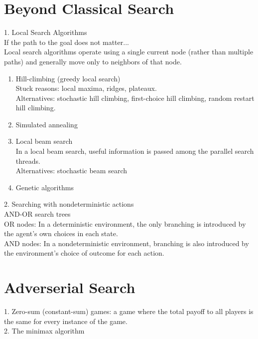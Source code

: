 \documentclass[12pt]{article}
\begin{document}
\section{Beyond Classical Search}

1. Local Search Algorithms \\

If the path to the goal does not matter... \\

Local search algorithms operate using a single current node (rather than multiple paths) and generally move only to neighbors of that node.

\begin{enumerate} 
  \item Hill-climbing (greedy local search) \\
    Stuck reasons: local maxima, ridges, plateaux. \\
    Alternatives: stochastic hill climbing, first-choice hill climbing, random restart hill climbing.
  \item Simulated annealing
  \item Local beam search \\
    In a local beam search, useful information is passed among the parallel search threads. \\
    Alternatives: stochastic beam search
  \item Genetic algorithms
\end{enumerate}

2. Searching with nondeterministic actions \\

AND-OR search trees \\

OR nodes: In a deterministic environment, the only branching is introduced by the agent's own choices in each state. \\
AND nodes: In a nondeterministic environment, branching is also introduced by the environment's choice of outcome for each action. \\

\section{Adverserial Search}

1. Zero-sum (constant-sum) games: a game where the total payoff to all players is the same for every instance of the game. \\

2. The minimax algorithm \\
\end{document}
